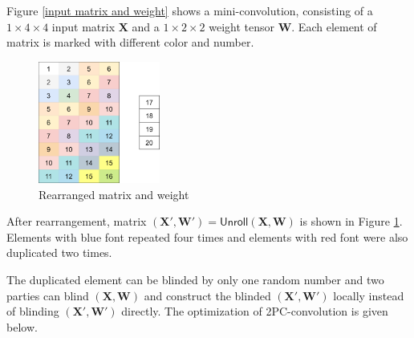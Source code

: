 \documentclass[letterpaper]{article} %
\begin{document}
    Figure \ref{input matrix and weight} shows a mini-convolution,
    consisting of a $1\times 4\times 4$ input matrix $\mathbf{X}$  and a $1\times 2\times 2$ weight tensor $\mathbf{W}$.
    Each element of matrix is marked with different color and number.
    \begin{figure}[htbp]
        \centering
        \includegraphics[width=4cm]{new_unrolling2.png}
        \caption{Rearranged matrix and weight}
        \label{rearrangement of matrix and weight}
    \end{figure}

    After rearrangement, matrix $(\mathbf{X}',\mathbf{W}')=\mathsf{Unroll}(\mathbf{X},\mathbf{W})$
    is shown in Figure \ref{rearrangement of matrix and weight}.
    Elements with blue font repeated four times
    and elements with red font were also duplicated two times.

    The duplicated element can be blinded by only one random number
    and two parties can  blind $(\mathbf{X},\mathbf{W})$ and
    construct the blinded $(\mathbf{X}',\mathbf{W}')$ locally instead of blinding $(\mathbf{X}',\mathbf{W}')$ directly.
    The optimization of 2PC-convolution is given below.


\end{document}
